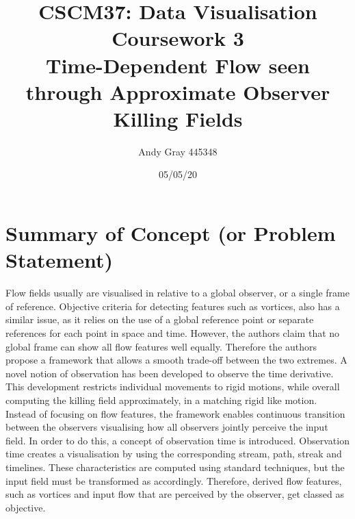 \documentclass[a4paper,9pt]{article}
\begin{document}
\title{\textbf{CSCM37: Data Visualisation \\Coursework 3\\Time-Dependent Flow seen through Approximate Observer Killing Fields \cite{papertitle}}}
\author{Andy Gray 445348\\}
\date{05/05/20}



\maketitle

\thispagestyle{empty}
\newpage
{}

\setlength{\topmargin}{-0.7in} 

\section{Summary of Concept (or Problem Statement)}

\small 
Flow fields usually are visualised in relative to a global observer, or a single frame of reference. Objective criteria for detecting features such as vortices, also has a similar issue, as it relies on the use of a global reference point or separate references for each point in space and time. However, the authors claim that no global frame can show all flow features well equally. Therefore the authors propose a framework that allows a smooth trade-off between the two extremes. A novel notion of observation has been developed to observe the time derivative. This development restricts individual movements to rigid motions, while overall computing the killing field approximately, in a matching rigid like motion. Instead of focusing on flow features, the framework enables continuous transition between the observers visualising how all observers jointly perceive the input field. In order to do this, a concept of observation time is introduced. Observation time creates a visualisation by using the corresponding stream, path, streak and timelines. These characteristics are computed using standard techniques, but the input field must be transformed as accordingly. Therefore, derived flow features, such as vortices and input flow that are perceived by the observer, get classed as objective.
\end{document}

